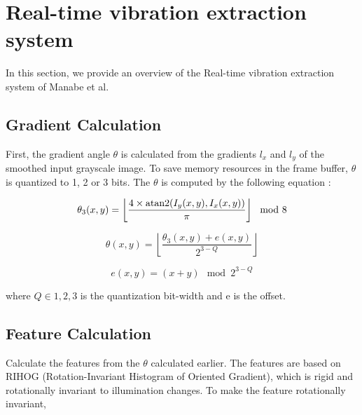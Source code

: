 \section{Real-time vibration extraction system}\label{section:system}

In this section, we provide an overview of the Real-time vibration extraction system of Manabe et al.

\subsection{Gradient Calculation}\label{subsection:gradient}

First, the gradient angle $\theta$ is calculated from the gradients $l_x$ and $l_y$
of the smoothed input grayscale image. To save memory resources in the frame buffer,
$\theta$ is quantized to 1, 2 or 3 bits. The $\theta$ is computed by the following equation :


\begin{equation}
  \label{equ:grad_angle1}
  \theta_3(x,y) = \left\lfloor \frac{4 \times {\rm atan2}(I_y(x,y),I_x(x,y))}{\pi} \right\rfloor\mod 8
  \end{equation}

\begin{equation}
  \label{equ:grad_angle2}
  \theta(x,y) = \left\lfloor \frac{\theta_3(x,y) + e(x,y)}{2^{3-Q}} \right\rfloor
\end{equation}

\begin{equation}
  \label{equ:grad_angle3}
  e(x,y) = (x+y)\mod 2^{3-Q}
  \end{equation}

where $Q\in{1,2,3}$ is the quantization bit-width and e is the offset.



\subsection{Feature Calculation}\label{subsection:feature}

Calculate the features from the $\theta$ calculated earlier.
The features are based on RIHOG (Rotation-Invariant Histogram of Oriented Gradient),
which is rigid and rotationally invariant to illumination changes.
To make the feature rotationally invariant,

